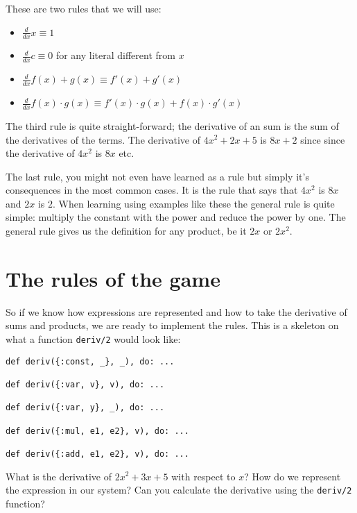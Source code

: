 \documentclass[a4paper,11pt]{article}
\begin{document}
These are two rules that we will use:

\begin{itemize}
\item $\frac{d}{dx} x \equiv 1$
\item $\frac{d}{dx} c \equiv 0$  for any literal different from $x$
\item $\frac{d}{dx} f(x) + g(x) \equiv  f'(x) + g'(x)$
\item $\frac{d}{dx} f(x) \cdot  g(x) \equiv  f'(x) \cdot  g(x) + f(x) \cdot  g'(x)$
\end{itemize}

\noindent The third rule is quite straight-forward; the derivative of an sum is
the sum of the derivatives of the terms. The derivative of
$4x^{2} + 2x + 5$ is $8x + 2$ since since the derivative of $4x^{2}$
is $8x$ etc.

The last rule, you might not even have learned as a rule but simply
it's consequences in the most common cases. It is the rule that says that
$4x^{2}$ is $8x$ and $2x$ is $2$. When learning using examples like these
the general rule is quite simple: multiply the constant with the power
and reduce the power by one. The general rule gives us the definition
for any product, be it $2x$ or $2x^{2}$.



\section{The rules of the game}

So if we know how expressions are represented and how to take the
derivative of sums and products, we are ready to implement the
rules. This is a skeleton on what a function {\tt deriv/2} would look like:

\begin{verbatim}
def deriv({:const, _}, _), do: ...

def deriv({:var, v}, v), do: ...

def deriv({:var, y}, _), do: ...

def deriv({:mul, e1, e2}, v), do: ...

def deriv({:add, e1, e2}, v), do: ...
\end{verbatim}

What is the derivative of $2x^{2} + 3x + 5$ with respect to $x$? How do
we represent the expression in our system? Can you calculate the
derivative using the {\tt deriv/2} function?
\end{document}
